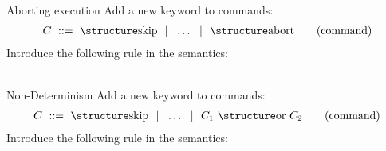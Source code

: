 \documentclass[aspectratio=169]{beamer}
\begin{document}
\begin{slide}{Aborting execution}
Add a new keyword to commands:
\begin{align*}
  C &~::=~ \kw {skip} ~~|~~ \ldots  ~~|~~ \kw{abort}
  \tag{command}\\
\end{align*}
Introduce the following rule in the semantics:\\
%
  {}%
  { \leadsto \bot}
\\[5mm] 
%
  {}%
  { \Longrightarrow {}}
\end{slide}

\begin{slide}{Non-Determinism}
Add a new keyword to commands:
\begin{align*}
  C &~::=~ \kw {skip} ~~|~~ \ldots  ~~|~~ C_1~\kw{or}~C_2
  \tag{command}\\
\end{align*}
Introduce the following rule in the semantics:\\
%
  { \Longrightarrow {}}%
  { \Longrightarrow {}}
\\[5mm]
%
  { \Longrightarrow {}}%
  { \Longrightarrow {}}


\end{slide}


\end{document}
